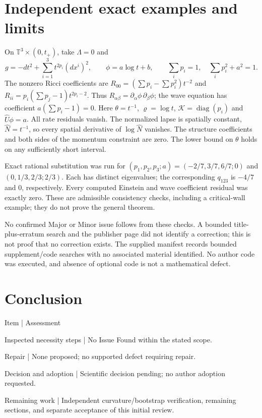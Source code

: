 \documentclass[10pt]{article}
\begin{document}
\section*{Independent exact examples and limits}
On \(\mathbb T^3\times(0,t_+)\), take \(\Lambda=0\) and \[g=-dt^2+\sum_{i=1}^3t^{2p_i}(dx^i)^2,\qquad
 \phi=a\log t+b,\qquad \sum_i p_i=1,\quad \sum_i p_i^2+a^2=1.\] The nonzero Ricci coefficients are \(R_{00}=(\sum p_i-\sum p_i^2)t^{-2}\) and \(R_{ii}=p_i(\sum p_j-1)t^{2p_i-2}\). Thus \(R_{\alpha\beta}=\partial_\alpha\phi\,\partial_\beta\phi\); the wave equation has coefficient \(a(\sum p_i-1)=0\). Here \(\theta=t^{-1}\), \(\varrho=\log t\), \(\mathcal K=\operatorname{diag}(p_i)\) and \(\widehat U\phi=a\). All rate residuals vanish. The normalized lapse is spatially constant, \(\widehat N=t^{-1}\), so every spatial derivative of \(\log\widehat N\) vanishes. The structure coefficients and both sides of the momentum constraint are zero. The lower bound on \(\theta\) holds on any sufficiently short interval.\par
Exact rational substitution was run for \((p_1,p_2,p_3;a)=(-2/7,3/7,6/7;0)\) and \((0,1/3,2/3;2/3)\). Each has distinct eigenvalues; the corresponding \(q_{123}\) is \(-4/7\) and \(0\), respectively. Every computed Einstein and wave coefficient residual was exactly zero. These are admissible consistency checks, including a critical-wall example; they do not prove the general theorem.\par
No confirmed Major or Minor issue follows from these checks. A bounded title-plus-erratum search and the publisher page did not identify a correction; this is not proof that no correction exists. The supplied manifest records bounded supplement/code searches with no associated material identified. No author code was executed, and absence of optional code is not a mathematical defect.\par
\section*{Conclusion}
Item | Assessment\par
Inspected necessity steps | No Issue Found within the stated scope.\par
Repair | None proposed; no supported defect requiring repair.\par
Decision and adoption | Scientific decision pending; no author adoption requested.\par
Remaining work | Independent curvature/bootstrap verification, remaining sections, and separate acceptance of this initial review.\par
\end{document}
